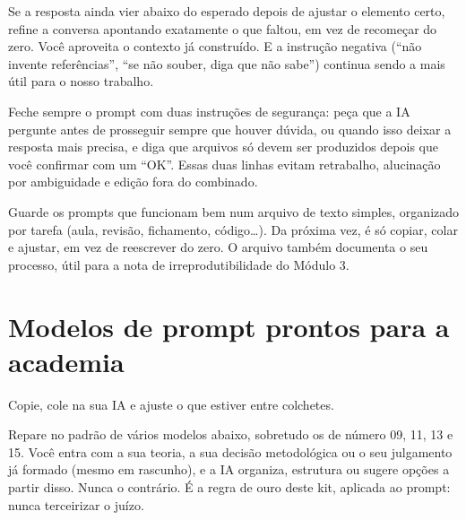 \documentclass[11pt,a4paper]{article}
\begin{document}
\begin{dica}
Se a resposta ainda vier abaixo do esperado depois de ajustar o elemento certo, refine a conversa apontando exatamente o que faltou, em vez de recomeçar do zero. Você aproveita o contexto já construído. E a instrução negativa (``não invente referências'', ``se não souber, diga que não sabe'') continua sendo a mais útil para o nosso trabalho.
\end{dica}

\begin{dica}
Feche sempre o prompt com duas instruções de segurança: peça que a IA pergunte antes de prosseguir sempre que houver dúvida, ou quando isso deixar a resposta mais precisa, e diga que arquivos só devem ser produzidos depois que você confirmar com um ``OK''. Essas duas linhas evitam retrabalho, alucinação por ambiguidade e edição fora do combinado.
\end{dica}

\begin{dica}
Guarde os prompts que funcionam bem num arquivo de texto simples, organizado por tarefa (aula, revisão, fichamento, código\ldots). Da próxima vez, é só copiar, colar e ajustar, em vez de reescrever do zero. O arquivo também documenta o seu processo, útil para a nota de irreprodutibilidade do Módulo 3.
\end{dica}

\section{Modelos de prompt prontos para a academia}
Copie, cole na sua IA e ajuste o que estiver entre colchetes.
\begin{dica}
Repare no padrão de vários modelos abaixo, sobretudo os de número 09, 11, 13 e 15. Você entra com a sua teoria, a sua decisão metodológica ou o seu julgamento já formado (mesmo em rascunho), e a IA organiza, estrutura ou sugere opções a partir disso. Nunca o contrário. É a regra de ouro deste kit, aplicada ao prompt: nunca terceirizar o juízo.
\end{dica}
\end{document}
